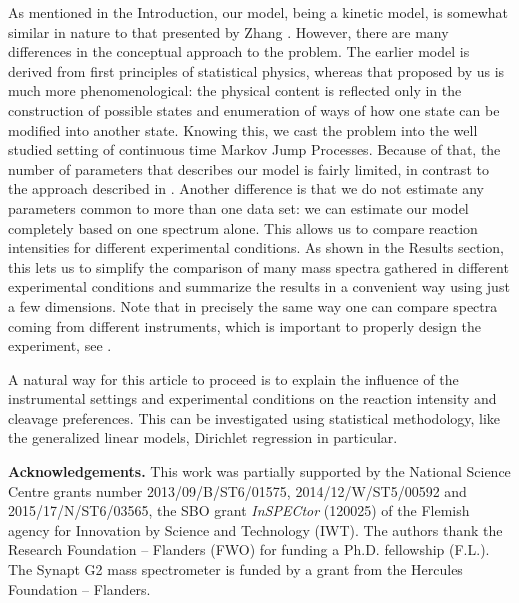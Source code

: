 \documentclass{llncs}
\begin{document}
As mentioned in the Introduction, our model, being a kinetic model, is somewhat similar in nature to that presented by Zhang \cite{Zhang2010-fp}. However, there are many differences in the conceptual approach to the problem. The earlier model is derived from first principles of statistical physics, whereas that proposed by us is much more phenomenological: the physical content is reflected only in the construction of possible states and enumeration of ways of how one state can be modified into another state. Knowing this, we cast the problem into the well studied setting of continuous time Markov Jump Processes. Because of that, the number of parameters that describes our model is fairly limited, in contrast to the approach described in  \cite{Zhang2010-fp}. Another difference is that we do not estimate any parameters common to more than one data set: we can estimate our model completely based on one spectrum alone. This allows us to compare reaction intensities for different experimental conditions. As shown in the Results section, this lets us to simplify the comparison of many mass spectra gathered in different experimental conditions and summarize the results in a convenient way using just a few dimensions. Note that in precisely the same way one can compare spectra coming from different instruments, which is important to properly design the experiment, see \cite{Lermyte2015-lm}.

A natural way for this article to proceed is to explain the influence of the instrumental settings and experimental conditions on the reaction intensity and cleavage preferences. This can be investigated using statistical methodology, like the generalized linear models, Dirichlet regression in particular.


{\textbf{Acknowledgements.}
        This work was partially supported by the National Science Centre grants number 2013/09/B/ST6/01575, 2014/12/W/ST5/00592 and 2015/17/N/ST6/03565, the SBO grant \textit{InSPECtor} (120025) of the Flemish agency for Innovation by Science and Technology (IWT). The authors thank the Research Foundation – Flanders (FWO) for funding a Ph.D. fellowship (F.L.). The Synapt G2 mass spectrometer is funded by a grant from the Hercules Foundation – Flanders.}

{\tiny}
\end{document}
